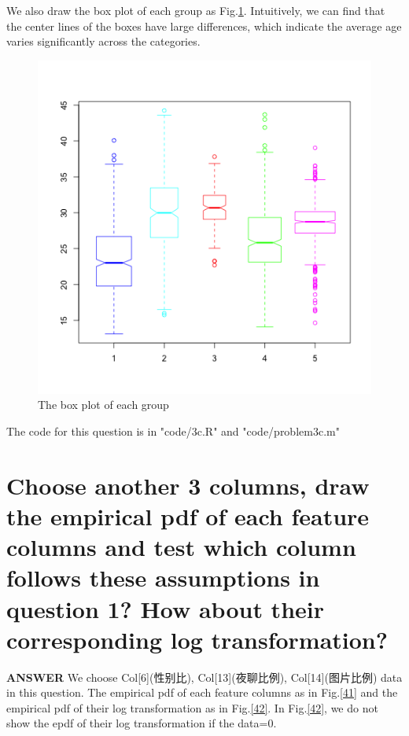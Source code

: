 \documentclass[a4paper]{article}
\begin{document}
We also draw the box plot of each group as Fig.\ref{3c2}. Intuitively, we can find that the center lines of the
boxes have large differences, which indicate the average age varies significantly across the categories.

\begin{figure}[h]
	\centering
	\includegraphics[width=0.9\linewidth]{images/3c3.png}
	\caption{\label{3c2}The box plot of each group}
\end{figure}

The code for this question is in "code/3c.R" and "code/problem3c.m"

\section{Choose another 3 columns, draw the empirical pdf of each feature columns and test which column follows these assumptions in question 1? How about their corresponding log transformation?}

\textbf{ANSWER}
We choose Col[6](性别比), Col[13](夜聊比例), Col[14](图片比例) data in this question. The empirical pdf of each feature columns as in Fig.\ref{41} and the empirical pdf of their log transformation as in Fig.\ref{42}. In Fig.\ref{42}, we do not show the epdf of their log transformation if the data=0.
\end{document}
